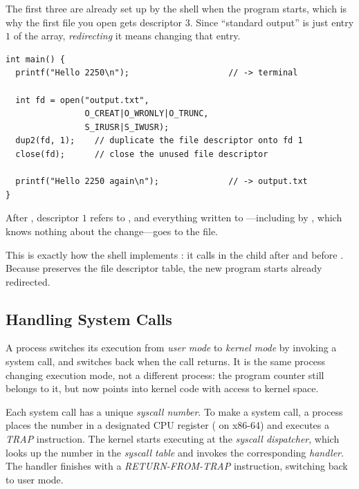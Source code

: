 The first three are already set up by the shell when the program starts, which is why the first file you open gets descriptor $3$. Since ``standard output'' is just entry $1$ of the array, \emph{redirecting} it means changing that entry.

\begin{example}
\begin{lstlisting}
int main() {
  printf("Hello 2250\n");                    // -> terminal

  int fd = open("output.txt",
                O_CREAT|O_WRONLY|O_TRUNC,
                S_IRUSR|S_IWUSR);
  dup2(fd, 1);    // duplicate the file descriptor onto fd 1
  close(fd);      // close the unused file descriptor

  printf("Hello 2250 again\n");              // -> output.txt
}
\end{lstlisting}
  After , descriptor $1$ refers to , and everything written to ---including by , which knows nothing about the change---goes to the file.
\end{example}

This is exactly how the shell implements : it calls  in the child after  and before . Because  preserves the file descriptor table, the new program starts already redirected.

\subsection{Handling System Calls}

A process switches its execution from \emph{user mode} to \emph{kernel mode} by invoking a system call, and switches back when the call returns. It is the same process changing execution mode, not a different process: the program counter still belongs to it, but now points into kernel code with access to kernel space.

\begin{definition}
  Each system call has a unique \emph{syscall number}. To make a system call, a process places the number in a designated CPU register ( on x86-64) and executes a \emph{TRAP} instruction. The kernel starts executing at the \emph{syscall dispatcher}, which looks up the number in the \emph{syscall table} and invokes the corresponding \emph{handler}. The handler finishes with a \emph{RETURN-FROM-TRAP} instruction, switching back to user mode.
\end{definition}

